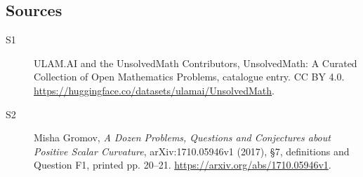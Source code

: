 \documentclass[11pt]{article}
\begin{document}
\subsection{Sources}
\begin{description}
\item[\hypertarget{source:statement:1}{S1}] ULAM.AI and the UnsolvedMath Contributors, UnsolvedMath: A Curated Collection of Open Mathematics Problems, catalogue entry. CC BY 4.0. \url{https://huggingface.co/datasets/ulamai/UnsolvedMath}.
\item[\hypertarget{source:statement:2}{S2}] Misha Gromov, \emph{A Dozen Problems, Questions and Conjectures about Positive Scalar Curvature}, arXiv:1710.05946v1 (2017), \S7, definitions and Question F1, printed pp. 20--21. \url{https://arxiv.org/abs/1710.05946v1}.
\end{description}
\label{end:statement}
\end{document}
